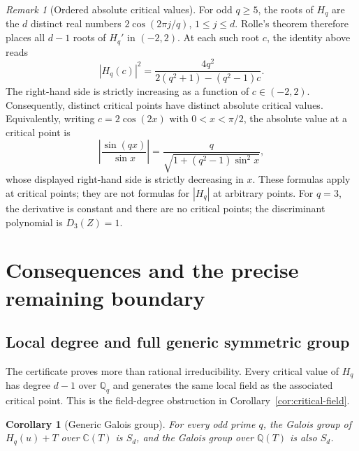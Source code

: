 \documentclass[11pt,a4paper]{article}
\newtheorem{corollary}[theorem]{Corollary}
\theoremstyle{definition}
\theoremstyle{remark}
\newtheorem{remark}[theorem]{Remark}
\newcommand{\QQ}{\mathbb Q}
\newcommand{\CC}{\mathbb C}
\begin{document}
\begin{remark}[Ordered absolute critical values]
\label{rem:absolute-critical-values}
For odd $q\geq5$, the roots of $H_q$ are the $d$ distinct real numbers
$2\cos(2\pi j/q)$, $1\leq j\leq d$.  Rolle's theorem therefore places all
$d-1$ roots of $H_q'$ in $(-2,2)$.  At each such root $c$, the identity above
reads
\[
 |H_q(c)|^2
 =\frac{4q^2}{2(q^2+1)-(q^2-1)c}.
\]
The right-hand side is strictly increasing as a function of $c\in(-2,2)$.
Consequently, distinct critical points have distinct absolute critical
values.  Equivalently, writing $c=2\cos(2x)$ with $0<x<\pi/2$, the absolute
value at a critical point is
\[
 \left|\frac{\sin(qx)}{\sin x}\right|
 =\frac{q}{\sqrt{1+(q^2-1)\sin^2x}},
\]
whose displayed right-hand side is strictly decreasing in $x$.  These
formulas apply at critical points; they are not formulas for $|H_q|$ at
arbitrary points.  For $q=3$, the derivative is constant and there are no
critical points; the discriminant polynomial is $D_3(Z)=1$.
\end{remark}


\section{Consequences and the precise remaining boundary}\label{sec:consequences}

\subsection{Local degree and full generic symmetric group}

The certificate proves more than rational irreducibility. Every
critical value of $H_q$ has degree $d-1$ over $\QQ_q$ and generates
the same local field as the associated critical point. This is the
field-degree obstruction in Corollary~\ref{cor:critical-field}.

\begin{corollary}[Generic Galois group]\label{cor:generic-galois}
For every odd prime $q$, the Galois group of $H_q(u)+T$ over
$\CC(T)$ is $S_d$, and the Galois group over $\QQ(T)$ is also $S_d$.
\end{corollary}
\end{document}
